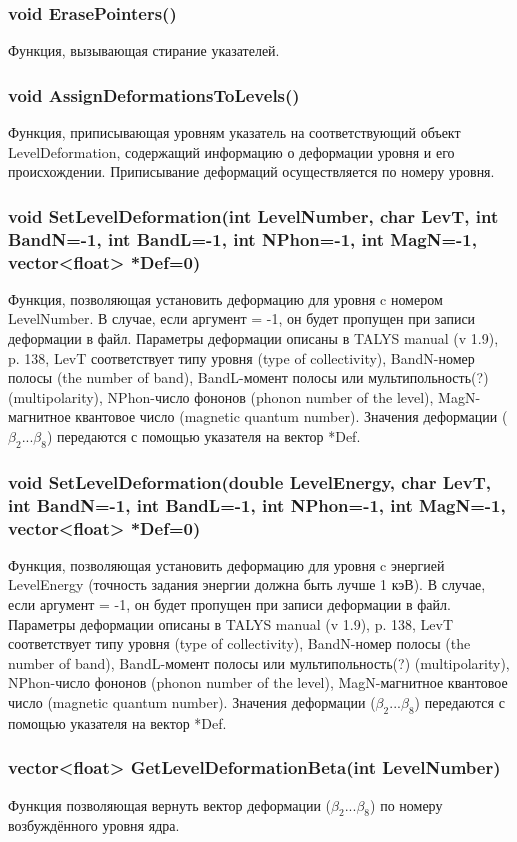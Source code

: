 \documentclass[a4paper,12pt]{extarticle}
\begin{document}
\subsubsection{void ErasePointers()}
Функция, вызывающая стирание указателей.
\subsubsection{void AssignDeformationsToLevels()}
Функция, приписывающая уровням указатель на соответствующий объект LevelDeformation, содержащий информацию о деформации уровня и его происхождении. Приписывание деформаций осуществляется по номеру уровня.
\subsubsection{void SetLevelDeformation(int LevelNumber, char LevT, int BandN=-1, int BandL=-1, int NPhon=-1, int MagN=-1, vector<float> *Def=0)}
Функция, позволяющая установить деформацию для уровня c номером LevelNumber. В случае, если аргумент = -1, он будет пропущен при записи деформации в файл. Параметры деформации описаны в TALYS manual (v 1.9), p. 138, LevT соответствует типу уровня (type of collectivity), BandN-номер полосы (the number of band), BandL-момент полосы или мультипольность(?) (multipolarity), NPhon-число фононов (phonon number of the level), MagN-магнитное квантовое число (magnetic quantum number). Значения деформации ($\beta_2...\beta_8$) передаются с помощью указателя на вектор *Def.
\subsubsection{void SetLevelDeformation(double LevelEnergy, char LevT, int BandN=-1, int BandL=-1, int NPhon=-1, int MagN=-1, vector<float> *Def=0)}
Функция, позволяющая установить деформацию для уровня c энергией LevelEnergy (точность задания энергии должна быть лучше 1 кэВ). В случае, если аргумент = -1, он будет пропущен при записи деформации в файл. Параметры деформации описаны в TALYS manual (v 1.9), p. 138, LevT соответствует типу уровня (type of collectivity), BandN-номер полосы (the number of band), BandL-момент полосы или мультипольность(?) (multipolarity), NPhon-число фононов (phonon number of the level), MagN-магнитное квантовое число (magnetic quantum number). Значения деформации ($\beta_2...\beta_8$) передаются с помощью указателя на вектор *Def.

\subsubsection{vector<float> GetLevelDeformationBeta(int LevelNumber)}
Функция позволяющая вернуть вектор деформации ($\beta_2...\beta_8$) по номеру возбуждённого уровня ядра.
\end{document}
